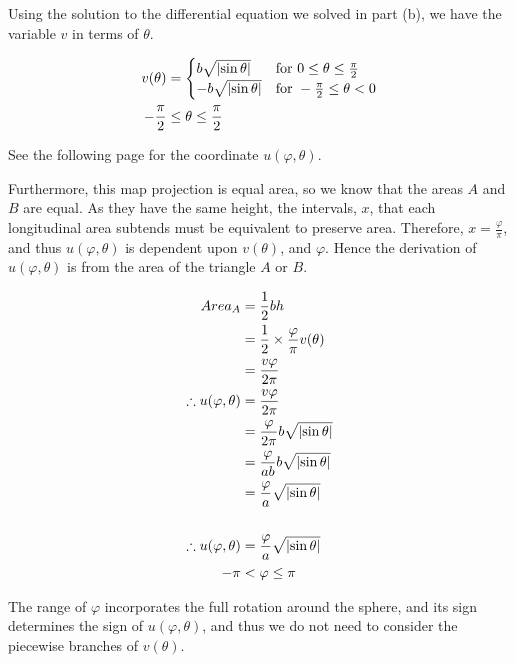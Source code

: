 \documentclass[a4paper]{article}
\begin{document}
\begin{enumerate}[label=(\alph*)]
	Using the solution to the differential equation we solved in part (b), we have the variable $v$ in terms of $\theta$. 

	\begin{align*}
	v(\theta) & =
	\begin{cases}
	b\sqrt{\abs{\sin \theta}} & \text{for } 0 \leq \theta \leq \frac{\pi}{2}\\ -b\sqrt{\abs{\sin \theta}} & \text{for } -\frac{\pi}{2} \leq \theta < 0\\
	\end{cases}\\
	-\frac{\pi}{2} & \leq \theta \leq \frac{\pi}{2}\\
	\end{align*}

	See the following page for the coordinate $u(\varphi,\theta)$.

	\pagebreak

	Furthermore, this map projection is equal area, so we know that the areas $A$ and $B$ are equal. As they have the same height, the intervals, $x$, that each longitudinal area subtends must be equivalent to preserve area. Therefore, $x = \frac{\varphi}{\pi}$, and thus $u(\varphi,\theta)$ is  dependent upon $v(\theta)$, and $\varphi$. Hence the derivation of $u(\varphi,\theta)$ is from the area of the triangle $A$ or $B$.

	\begin{align*}
	Area_A & = \frac{1}{2}bh\\
	& = \frac{1}{2}\times \frac{\varphi}{\pi} {v(\theta)}\\
	& = \frac{v\varphi}{2\pi}\\
	\therefore u(\varphi,\theta) & = \frac{v\varphi}{2\pi}\\
	& = \frac{\varphi}{2\pi}b{\sqrt{\abs{\sin{\theta}}}}\\
	& = \frac{\varphi}{ab}b{\sqrt{\abs{\sin{\theta}}}}\\
	& = \frac{\varphi}{a}{\sqrt{\abs{\sin{\theta}}}}\\
	\\
	\therefore u(\varphi,\theta) & = \frac{\varphi}{a}{\sqrt{\abs{\sin{\theta}}}}\\
	-\pi & < \varphi \leq \pi\\
	\end{align*}

	The range of $\varphi$ incorporates the full rotation around the sphere, and its sign determines the sign of $u(\varphi,\theta)$, and thus we do not need to consider the piecewise branches of $v(\theta)$.
	

\end{enumerate}
\end{document}
